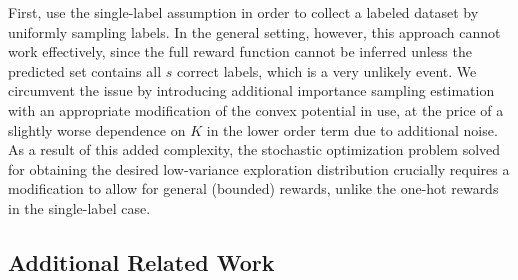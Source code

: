 \documentclass[11pt]{article}
\newcommand{\calH}{\mathcal{H}}
\theoremstyle{plain}
\begin{document}
First, \cite{erez2024fast} use the single-label assumption in order to collect a labeled dataset by uniformly sampling labels. In the general setting, however, this approach cannot work effectively, since the full reward function cannot be inferred unless the predicted set contains all $s$ correct labels, which is a very unlikely event. We circumvent the issue by introducing additional importance sampling estimation with an appropriate modification of the convex potential in use, at the price of a slightly worse dependence on $K$ in the lower order term due to additional noise.
As a result of this added complexity, the stochastic optimization problem solved for obtaining the desired low-variance exploration distribution crucially requires a modification to allow for general (bounded) rewards, unlike the one-hot rewards in the single-label case.
% 

 
\subsection{Additional Related Work}


\end{document}
